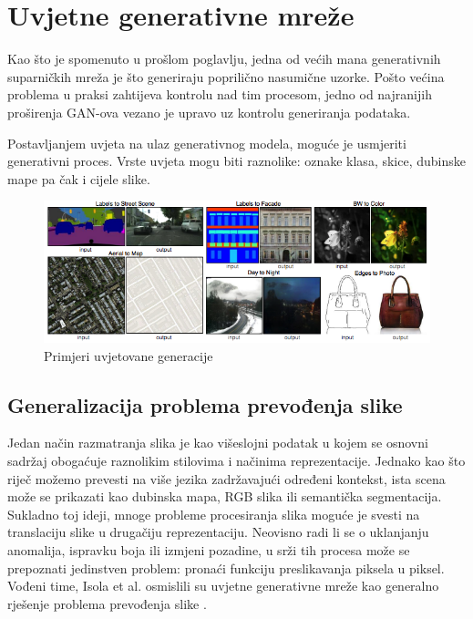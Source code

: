 \documentclass[lmodern, utf8, seminar]{fer}
\begin{document}


\chapter{Uvjetne generativne mreže}
Kao što je spomenuto u prošlom poglavlju, jedna od većih mana generativnih suparničkih mreža je što generiraju poprilično nasumične uzorke. Pošto većina problema u praksi zahtijeva kontrolu nad tim procesom, jedno od najranijih proširenja GAN-ova vezano je upravo uz kontrolu generiranja podataka. 

Postavljanjem uvjeta na ulaz generativnog modela, moguće je usmjeriti generativni proces. Vrste uvjeta mogu biti raznolike: oznake klasa, skice, dubinske mape pa čak i cijele slike.

\begin{figure}[H]
    \centering
    \includegraphics[width=1\textwidth]{isola2017-conditioned-generation}
    \caption{Primjeri uvjetovane generacije}
    \label{fig:isola2017-conditioned-generation}
\end{figure}


\section{Generalizacija problema prevođenja slike}
Jedan način razmatranja slika je kao višeslojni podatak u kojem se osnovni sadržaj obogaćuje raznolikim stilovima i načinima reprezentacije. 
Jednako kao što riječ možemo prevesti na više jezika zadržavajući određeni kontekst, ista scena može se prikazati kao dubinska mapa, RGB slika ili semantička segmentacija. Sukladno toj ideji, mnoge probleme procesiranja slika moguće je svesti na translaciju slike u drugačiju reprezentaciju. Neovisno radi li se o uklanjanju anomalija, ispravku boja ili izmjeni pozadine, u srži tih procesa može se prepoznati jedinstven problem: pronaći funkciju preslikavanja piksela u piksel. Vođeni time, Isola et al. osmislili su uvjetne generativne mreže kao generalno rješenje problema prevođenja slike \cite{isola2017image}.
\newline
\end{document}
